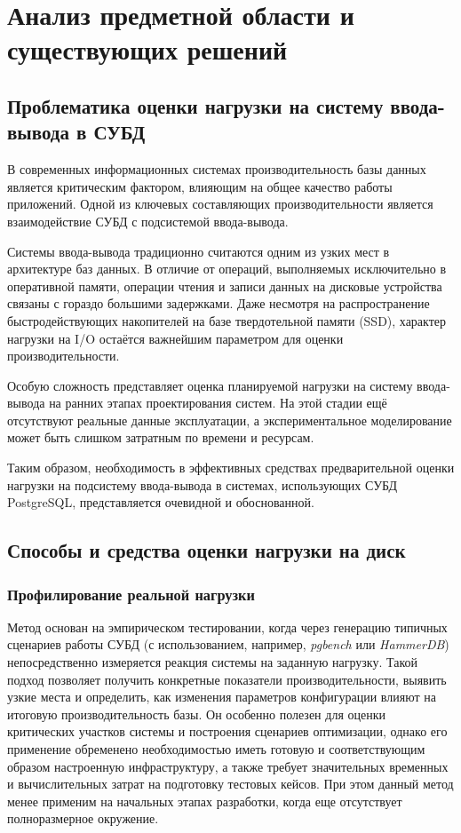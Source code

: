 \section{Анализ предметной области и существующих решений}

\subsection{Проблематика оценки нагрузки на систему ввода-вывода в СУБД}

В современных информационных системах производительность базы данных является критическим фактором, влияющим на общее качество 
работы приложений. Одной из ключевых составляющих производительности является взаимодействие СУБД с подсистемой ввода-вывода. \cite{vershinin2023optimization}

Системы ввода-вывода традиционно считаются одним из узких мест в архитектуре баз данных. В отличие от операций, 
выполняемых исключительно в оперативной памяти, операции чтения и записи данных на дисковые устройства связаны 
с гораздо большими задержками. Даже несмотря на распространение быстродействующих накопителей на базе твердотельной памяти (SSD), 
характер нагрузки на I/O остаётся важнейшим параметром для оценки производительности. \cite{hellerstein2007architecture} \cite{malykh2022migration}

Особую сложность представляет оценка планируемой нагрузки на систему ввода-вывода на ранних этапах проектирования систем. 
На этой стадии ещё отсутствуют реальные данные эксплуатации, а экспериментальное моделирование может быть слишком затратным по времени и ресурсам.

Таким образом, необходимость в эффективных средствах предварительной оценки нагрузки на подсистему ввода-вывода в системах, 
использующих СУБД PostgreSQL, представляется очевидной и обоснованной.


\subsection{Способы и средства оценки нагрузки на диск} 


\subsubsection{Профилирование реальной нагрузки}
Метод основан на эмпирическом тестировании, когда через генерацию типичных сценариев работы СУБД (с использованием, например, 
\textit{pgbench} или \textit{HammerDB}) непосредственно измеряется реакция системы на заданную нагрузку. 
Такой подход позволяет получить конкретные показатели производительности, выявить узкие места и определить, 
как изменения параметров конфигурации влияют на итоговую производительность базы. Он особенно полезен для оценки критических 
участков системы и построения сценариев оптимизации, однако его применение обременено необходимостью иметь готовую и 
соответствующим образом настроенную инфраструктуру, а также требует значительных временных и вычислительных затрат на 
подготовку тестовых кейсов. При этом данный метод менее применим на начальных этапах разработки, когда еще отсутствует 
полноразмерное окружение. \cite{han2021cardinality}


